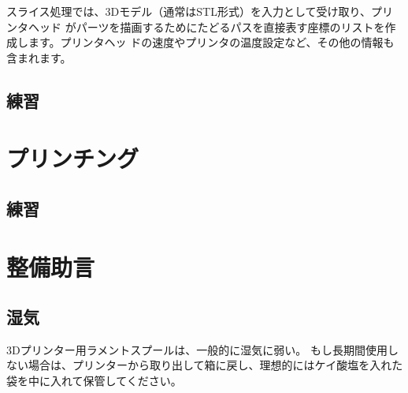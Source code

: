\documentclass[10pt,a4paper,onecolumn,notitlepage,oneside,dvipdfmx]{article}
\begin{document}
スライス処理では、3Dモデル（通常はSTL形式）を入力として受け取り、プリンタヘッド
がパーツを描画するためにたどるパスを直接表す座標のリストを作成します。プリンタヘッ
ドの速度やプリンタの温度設定など、その他の情報も含まれます。

\subsection{練習}
\label{sec:org6f97c04}

\section{プリンチング}
\label{sec:org9e0b062}
\subsection{練習}
\label{sec:orgf567e1e}

\section{整備助言}
\label{sec:org9be53e5}

\subsection{湿気}
\label{sec:orgc54b4ad}
3Dプリンター用ラメントスプールは、一般的に湿気に弱い。
もし長期間使用しない場合は、プリンターから取り出して箱に戻し、理想的にはケイ酸塩を入れた袋を中に入れて保管してください。
\end{document}
